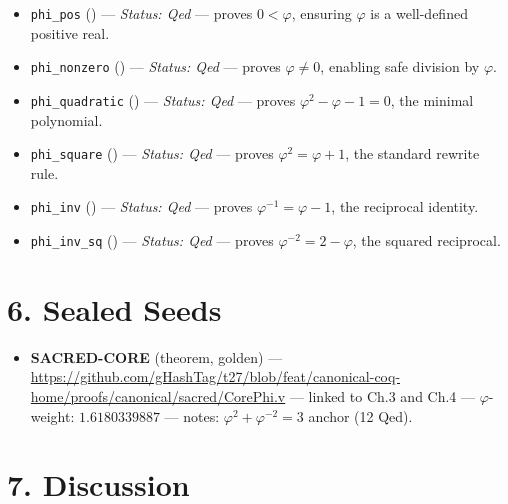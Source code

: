 \begin{itemize}
\tightlist
\item
  \texttt{phi\_pos}
  ()
  --- \emph{Status: Qed} --- proves
  \(0 < \varphi\), ensuring \(\varphi\) is a
  well-defined positive real.
\item
  \texttt{phi\_nonzero}
  ()
  --- \emph{Status: Qed} --- proves
  \(\varphi \neq 0\), enabling safe division by
  \(\varphi\).
\item
  \texttt{phi\_quadratic}
  ()
  --- \emph{Status: Qed} --- proves
  \(\varphi^2 - \varphi - 1 = 0\), the minimal
  polynomial.
\item
  \texttt{phi\_square}
  ()
  --- \emph{Status: Qed} --- proves
  \(\varphi^2 = \varphi + 1\), the standard
  rewrite rule.
\item
  \texttt{phi\_inv}
  ()
  --- \emph{Status: Qed} --- proves
  \(\varphi^{-1} = \varphi - 1\), the reciprocal
  identity.
\item
  \texttt{phi\_inv\_sq}
  ()
  --- \emph{Status: Qed} --- proves
  \(\varphi^{-2} = 2 - \varphi\), the squared
  reciprocal.
\end{itemize}

\section{6. Sealed Seeds}\label{fa_03:sealed-seeds}

\begin{itemize}
\tightlist
\item
  \textbf{SACRED-CORE} (theorem, golden) ---
  \url{https://github.com/gHashTag/t27/blob/feat/canonical-coq-home/proofs/canonical/sacred/CorePhi.v}
  --- linked to Ch.3 and Ch.4 ---
  \(\varphi\)-weight: \(1.6180339887\) --- notes:
  \(\varphi^2 + \varphi^{-2} = 3\) anchor (12
  Qed).
\end{itemize}

\section{7. Discussion}\label{fa_03:discussion}

